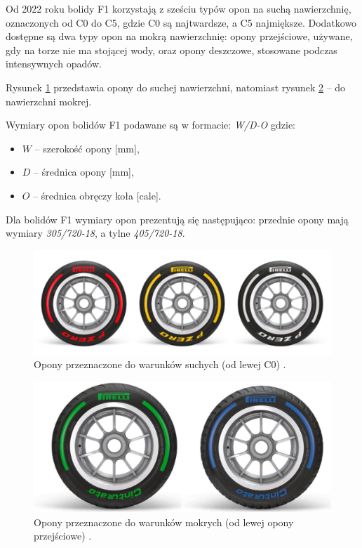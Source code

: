 \documentclass{article}
\begin{document}
	Od 2022 roku bolidy F1 korzystają z sześciu typów opon na suchą nawierzchnię, oznaczonych od C0 do C5, gdzie C0 są najtwardsze, a C5 najmiększe. Dodatkowo dostępne są dwa typy opon na mokrą nawierzchnię: opony przejściowe, używane, gdy na torze nie ma stojącej wody, oraz opony deszczowe, stosowane podczas intensywnych opadów.  
	
	Rysunek \ref{fig:tires_dry} przedstawia opony do suchej nawierzchni, natomiast rysunek \ref{fig:tires_wet} – do nawierzchni mokrej.
	
	Wymiary opon bolidów F1 podawane są w formacie: \textit{W/D-O} gdzie:
	\begin{itemize}
		\item $W$ – szerokość opony [mm],
		\item $D$ – średnica opony [mm],
		\item $O$ – średnica obręczy koła [cale].
	\end{itemize}
	
	Dla bolidów F1 wymiary opon prezentują się następująco: przednie opony mają wymiary \textit{305/720-18}, a tylne \textit{405/720-18}.
	
	\begin{figure}[h!]
		\centering
		\includegraphics[scale=0.25]{dry_tires.jpg}
		\caption{Opony przeznaczone do warunków suchych (od lewej C0) \cite{tires}.}
		\label{fig:tires_dry}
	\end{figure}
	
	\begin{figure}[h!]
		\centering
		\includegraphics[scale=0.25]{wet_tires.jpg}
		\caption{Opony przeznaczone do warunków mokrych (od lewej opony przejściowe) \cite{tires}.}
		\label{fig:tires_wet}
	\end{figure}
	
\end{document}
